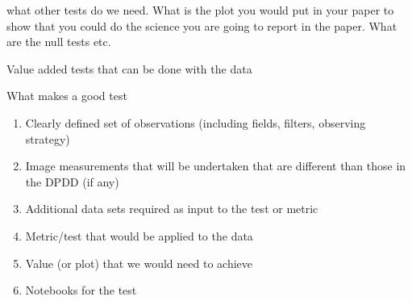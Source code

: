 \documentclass[modern]{desc-tex/styles/lsstdescnote}
\begin{document}
what other tests do we need. What is the plot you would put in your paper to show that you could do the science you are going to report in the paper. What are the null tests etc.

\appendix

Value added tests that can be done with the data

What makes a good test
\begin{enumerate}
\item Clearly defined set of observations (including fields, filters, observing strategy)
\item Image measurements that will be undertaken that are different than those in the DPDD (if any)
\item Additional data sets required as input to the test or metric
\item Metric/test that would be applied to the data
\item Value (or plot) that we would need to achieve
\item Notebooks for the test
\end{enumerate}

\begin{acknowledgments}
% 
\end{acknowledgments}
  

\end{document}
